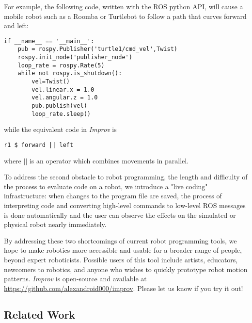 \documentclass[sigconf]{acmart}
\begin{document}
For example, the following code, written with the ROS python API, will cause a
mobile robot such as a Roomba or Turtlebot to follow a path that curves
forward and left:

\begin{verbatim}
if __name__ == '__main__':
    pub = rospy.Publisher('turtle1/cmd_vel',Twist)
    rospy.init_node('publisher_node')
    loop_rate = rospy.Rate(5)
    while not rospy.is_shutdown():
        vel=Twist()
        vel.linear.x = 1.0
        vel.angular.z = 1.0
        pub.publish(vel)
        loop_rate.sleep()
\end{verbatim}

while the equivalent code in \emph{Improv} is

\begin{verbatim}
r1 $ forward || left
\end{verbatim}

where $||$ is an operator which combines movements in parallel.

To address the second obstacle to robot programming, the length and difficulty
of the process to evaluate code on a robot, we introduce a "live coding"
infrastructure: when changes to the program file are saved, the process of
interpreting code and converting high-level commands to low-level ROS messages
is done automatically and the user can observe the effects on the simulated or
physical robot nearly immediately.

By addressing these two shortcomings of current robot programming tools, we hope
to make robotics more accessible and usable for a broader range of people,
beyond expert roboticists. Possible users of this tool include
artists, educators, newcomers to robotics, and anyone who wishes to quickly
prototype robot motion patterns. \emph{Improv} is open-source and available at
\url{https://github.com/alexandroid000/improv}. Please let us know if you try it
out!

\subsection{Related Work}
\end{document}
